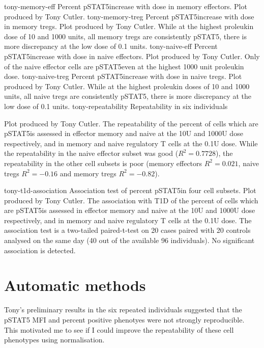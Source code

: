 {tony-memory-eff}
{ Percent pSTAT5\positive increase with dose in memory effectors. }
{
  Plot produced by Tony Cutler.
}
{tony-memory-treg}
{ Percent pSTAT5\positive increase with dose in memory tregs. }
{
  Plot produced by Tony Cutler.
  While at the highest proleukin dose of 10 and 1000 units, all memory tregs are consistently pSTAT5\positive,
  there is more discrepancy at the low dose of 0.1 units.
}
{tony-naive-eff}
{ Percent pSTAT5\positive increase with dose in naive effectors. }
{
  Plot produced by Tony Cutler.
  Only  of the naive effector cells are pSTAT5\positive even at the highest 1000 unit proleukin dose.
}
{tony-naive-treg}
{ Percent pSTAT5\positive increase with dose in naive tregs. }
{
  Plot produced by Tony Cutler.
  While at the highest proleukin doses of 10 and 1000 units, all naive tregs are consistently pSTAT5\positive,
  there is more discrepancy at the low dose of 0.1 units.
}
{tony-repeatability}
{ Repeatability in six individuals }
{
  Plot produced by Tony Cutler.
  The repeatability of the percent of cells which are pSTAT5\positive is assessed in effector memory and naive at the 10U and 1000U dose
  respectively, and in memory and naive regulatory T cells at the 0.1U dose.
  While the repeatability in the naive effector subset was good ($R^2=0.7728$), the repeatability in the other cell subsets is poor
  (memory effectors $R^2=0.021$, naive tregs $R^2=-0.16$ and memory tregs $R^2=-0.82$).

}
{tony-t1d-association}
{ Association test of percent pSTAT5\positive in four cell subsets. }
{
  Plot produced by Tony Cutler.
  The association with T1D of the percent of cells which are pSTAT5\positive is assessed in effector memory and naive at the 10U and 1000U dose
  respectively, and in memory and naive regulatory T cells at the 0.1U dose.
  The association test is a two-tailed paired-t-test on 20 cases paired with 20 controls analysed on the same day (40 out of the available 96 individuals).
  No significant association is detected.
}

\section{Automatic methods}

Tony's preliminary results in the six repeated individuals suggested that the pSTAT5 MFI and percent positive phenotyes were not strongly reproducible.
This motivated me to see if I could improve the repeatability of these cell phenotypes using normalisation.

